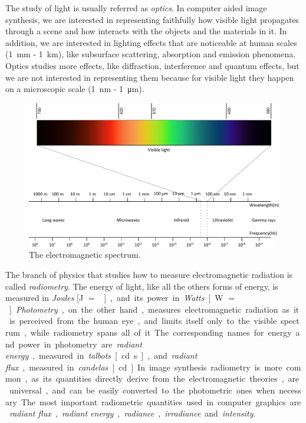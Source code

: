 The study of light is usually referred as \emph{optics}. In computer aided image synthesis, we are interested in representing faithfully how visible light propagates through a scene and how interacts with the objects and the materials in it. In addition, we are interested in lighting effects that are noticeable at human scales (\SI{1}{\milli\meter} - \SI{1}{\kilo\meter}), like subsurface scattering, absorption and emission phenomena. Optics studies more effects, like diffraction, interference and quantum effects, but we are not interested in representing them because for visible light they happen on a microscopic scale (\SI{1}{\nano\meter} - \SI{1}{\micro\meter}). 

\begin{figure}[!ht]
\centering
\includegraphics[width=1.0\textwidth]{images/spectrum.pdf}
\caption{The electromagnetic spectrum.}
\label{fig:spectrum}
\end{figure}

The branch of physics that studies how to measure electromagnetic radiation is called \emph{radiometry}. The energy of light, like all the others forms of energy, is measured in \emph{Joules} [\si{\joule} $=$ \si{\kg\meter\square\per\second\square}], and its power in \emph{Watts} [\si{\watt} $=$ \si{\kg\meter\square\per\second\cubed}]. \emph{Photometry}, on the other hand, measures electromagnetic radiation as it is perceived from the human eye, and limits itself only to the visible spectrum, while radiometry spans all of it. The corresponding names for energy and power in photometry are \emph{radiant energy}, measured in \emph{talbots} [\si{\candela\second}], and \emph{radiant flux}, measured in \emph{candelas} [\si{\candela}]. 

In image synthesis radiometry is more common, as its quantities directly derive from the electromagnetic theories, are universal, and can be easily converted to the photometric ones when necessary. The most important radiometric quantities used in computer graphics are \emph{radiant flux}, \emph{radiant energy}, \emph{radiance}, \emph{irradiance} and \emph{intensity}.


